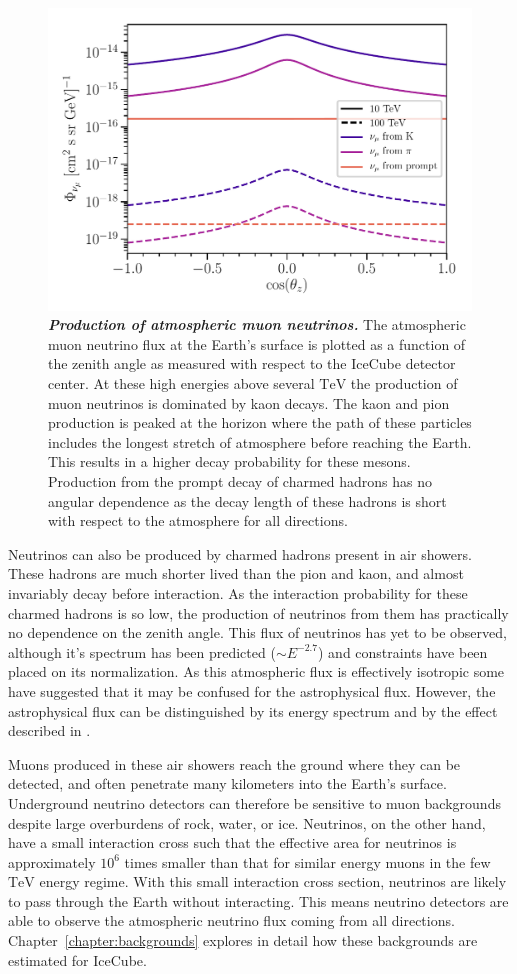 \begin{figure}
	\centering
	\includegraphics[width=0.7\linewidth]{figures/atm_flux}
	\internallinenumbers
	\caption{\textbf{\textit{Production of atmospheric muon neutrinos.}}
		The atmospheric muon neutrino flux at the Earth's surface is plotted as a function of the zenith angle as measured with respect to the IceCube detector center.
		At these high energies above several $\si\TeV$ the production of muon neutrinos is dominated by kaon decays.
		The kaon and pion production is peaked at the horizon where the path of these particles includes the longest stretch of atmosphere before reaching the Earth.
		This results in a higher decay probability for these mesons.
		Production from the prompt decay of charmed hadrons has no angular dependence as the decay length of these hadrons is short with respect to the atmosphere for all directions.
	}\label{fig:atmo_zenith}
\end{figure}

Neutrinos can also be produced by charmed hadrons present in air showers.
These hadrons are much shorter lived than the pion and kaon, and almost invariably decay before interaction.
As the interaction probability for these charmed hadrons is so low, the production of neutrinos from them has practically no dependence on the zenith angle.
This flux of neutrinos has yet to be observed, although it's spectrum has been predicted ($\sim E^{-2.7}$) and constraints have been placed on its normalization.
As this atmospheric flux is effectively isotropic some have suggested that it may be confused for the astrophysical flux.
However, the astrophysical flux can be distinguished by its energy spectrum and by the effect described in .

Muons produced in these air showers reach the ground where they can be detected, and often penetrate many kilometers into the Earth's surface.
Underground neutrino detectors can therefore be sensitive to muon backgrounds despite large overburdens of rock, water, or ice.
Neutrinos, on the other hand, have a small interaction cross such that the effective area for neutrinos is approximately $10^6$ times smaller than that for similar energy muons in the few $\si\TeV$ energy regime.
With this small interaction cross section, neutrinos are likely to pass through the Earth without interacting.
This means neutrino detectors are able to observe the atmospheric neutrino flux coming from all directions.
Chapter~\ref{chapter:backgrounds} explores in detail how these backgrounds are estimated for IceCube.

